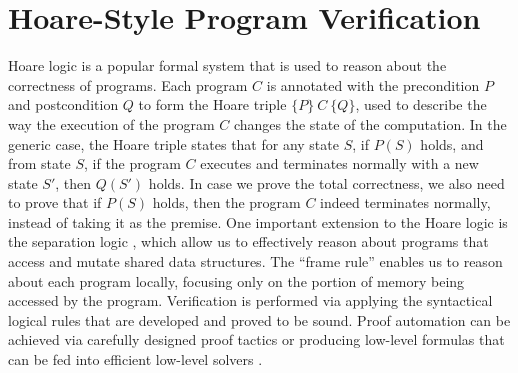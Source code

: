 \label{chapt:related}

\section{Hoare-Style Program Verification}

Hoare logic \cite{hoare69} is a popular formal system that is used to reason about the correctness of programs.
Each program $C$ is annotated with the precondition $P$ and postcondition $Q$ to form the Hoare triple $\{P\}~C~\{Q\}$, used to
describe the way the execution of the program $C$ changes the state of the computation.
In the generic case, the Hoare triple states that for any state $S$, if $P(S)$ holds, and from state $S$, if the program $C$ executes and terminates normally
with a new state $S'$, then $Q(S')$ holds. In case we prove the total correctness, we also need to prove that if $P(S)$ holds, then
the program $C$ indeed terminates normally, instead of taking it as the premise.
One important extension to the Hoare logic is the separation logic \cite{reynolds02}, which allow us to effectively reason about
programs that access and mutate shared data structures. The ``frame rule'' enables us to reason about each program locally,
focusing only on the portion of memory being accessed by the program.
Verification is performed via applying the syntactical logical rules that are developed and proved to be sound.
Proof automation can be achieved via carefully designed proof tactics or producing low-level formulas that can be fed into
efficient low-level solvers  \cite{boogie05,dafny10}.

